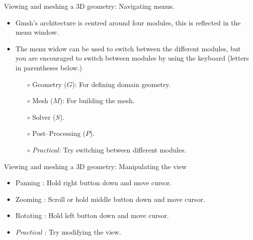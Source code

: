 \documentclass[t]{beamer}
\begin{document}
\begin{frame}{Viewing and meshing a 3D geometry: Navigating menus.}
   \begin{itemize}
     \item Gmsh's architecture is centred around four modules, this is reflected in the menu window.\\[10pt]
     \item The menu widow can be used to switch between the different modules, but you are encouraged to switch between modules by using the keyboard (letters in parentheses below.)\\[10pt]
     \begin{itemize}
       \item[$\circ$] Geometry ($G$): For defining domain geometry.
       \item[$\circ$] Mesh ($M$): For building the mesh.
       \item[$\circ$] Solver ($S$).
       \item[$\circ$] Post--Processing ($P$).
       \item[$\circ$] \emph{Practical:} Try switching between different modules.
     \end{itemize}
   \end{itemize}
\end{frame}

\begin{frame}{Viewing and meshing a 3D geometry: Manipulating the view}
\begin{itemize}
\item Panning : Hold right button down and move cursor.
\item Zooming : Scroll or hold middle button down and move cursor.
\item Rotating : Hold left button down and move cursor.
\item \emph{Practical :} Try modifying the view.
\end{itemize}
\end{frame}
\end{document}

